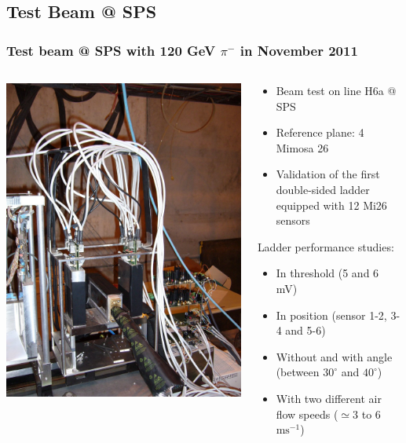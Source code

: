 \documentclass{beamer}
\begin{document}
  \subsection{Test Beam @ SPS}
  \begin{frame}
    \frametitle{Test beam @ SPS with 120 GeV $\pi^-$ in November 2011}

    \begin{columns}[t]
      \begin{column}{4cm}
        \begin{center}
          \includegraphics[width = 4 cm]{Pictures/plume_testBeam_nov2011.jpg}
        \end{center}
      \end{column}

      \begin{column}{7cm}
        \vspace{-0.8cm}
        \begin{itemize}
          \item Beam test on line H6a @ SPS
          \item Reference plane: 4 Mimosa 26
          \item Validation of the first double-sided ladder equipped with 12 Mi26 sensors
        \end{itemize}

        \vspace{-0.3cm}
        \begin{block}{Ladder performance studies:}
          \begin{itemize}
            \item In threshold (5 and 6 mV)
            \item In position (sensor 1-2, 3-4 and 5-6)
            \item Without and with angle (between $30^{\circ}$ and $40^{\circ}$)
            \item With two different air flow speeds ($\simeq 3$ to 6 $\text{ms}^{-1}$)
          \end{itemize}
        \end{block}
      \end{column}
    \end{columns}

    \vspace{0.1cm}
    \footnotesize{
    }
  \end{frame}
\end{document}
